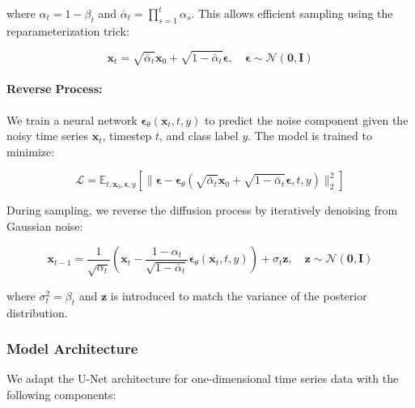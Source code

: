 \documentclass{article}
\begin{document}
where $\alpha_t = 1 - \beta_t$ and $\bar{\alpha}_t = \prod_{s=1}^t \alpha_s$. This allows efficient sampling using the reparameterization trick:

\begin{equation}
\mathbf{x}_t = \sqrt{\bar{\alpha}_t} \mathbf{x}_0 + \sqrt{1 - \bar{\alpha}_t} \boldsymbol{\epsilon}, \quad \boldsymbol{\epsilon} \sim \mathcal{N}(\mathbf{0}, \mathbf{I})
\end{equation}

\paragraph{Reverse Process:} We train a neural network $\boldsymbol{\epsilon}_\theta(\mathbf{x}_t, t, y)$ to predict the noise component given the noisy time series $\mathbf{x}_t$, timestep $t$, and class label $y$. The model is trained to minimize:

\begin{equation}
\mathcal{L} = \mathbb{E}_{t, \mathbf{x}_0, \boldsymbol{\epsilon}, y} \left[ \| \boldsymbol{\epsilon} - \boldsymbol{\epsilon}_\theta(\sqrt{\bar{\alpha}_t} \mathbf{x}_0 + \sqrt{1 - \bar{\alpha}_t} \boldsymbol{\epsilon}, t, y) \|_2^2 \right]
\end{equation}

During sampling, we reverse the diffusion process by iteratively denoising from Gaussian noise:

\begin{equation}
\mathbf{x}_{t-1} = \frac{1}{\sqrt{\alpha_t}} \left( \mathbf{x}_t - \frac{1-\alpha_t}{\sqrt{1-\bar{\alpha}_t}} \boldsymbol{\epsilon}_\theta(\mathbf{x}_t, t, y) \right) + \sigma_t \mathbf{z}, \quad \mathbf{z} \sim \mathcal{N}(\mathbf{0}, \mathbf{I})
\end{equation}

where $\sigma_t^2 = \beta_t$ and $\mathbf{z}$ is introduced to match the variance of the posterior distribution.

\subsubsection{Model Architecture}

We adapt the U-Net architecture for one-dimensional time series data with the following components:
\end{document}
